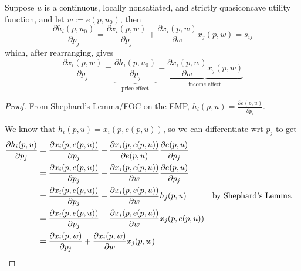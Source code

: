 \begin{prop}
  Suppose $u$ is a continuous, locally nonsatiated, and strictly
  quasiconcave utility function, and let $w := e(p, u_0)$, then
  \[
  \frac{\partial h_i (p, u_0)}{\partial p_j}
  = \frac{\partial x_i(p,w)}{\partial p_j}
  + \frac{\partial x_i(p,w)}{\partial w} x_j(p,w) 
  = s_{ij}
  \]
  which, after rearranging, gives
  \[
  \frac{\partial x_i(p,w)}{\partial p_j} 
  = \underbrace{\frac{\partial h_i (p, u_0)}{\partial p_j}}_{\text{price effect}}
  - \underbrace{\frac{\partial x_i(p,w)}{\partial w} x_j(p,w)}_{\text{income effect}}
  \]
\end{prop}

\begin{proof}
  From Shephard's Lemma/FOC on the EMP, $h_i(p,u) = \frac{\partial
    e(p,u)}{\partial p_i}$. 


  We know that $h_i(p,u) = x_i(p, e(p,u))$, so we can differentiate
  wrt $p_j$ to get
  \begin{align}
    \frac{\partial h_i(p,u)}{\partial p_j}
    & = \frac{\partial x_i(p, e(p,u))}{\partial p_j}
    + \frac{\partial x_i(p,e(p,u))}{\partial e(p,u)}
    \frac{\partial e(p,u)}{\partial p_j} & \notag \\
    & = \frac{\partial x_i(p, e(p,u))}{\partial p_j}
    + \frac{\partial x_i(p,e(p,u))}{\partial w}
    \frac{\partial e(p,u)}{\partial p_j} & \notag \\
    & = \frac{\partial x_i(p, e(p,u))}{\partial p_j}
    + \frac{\partial x_i(p,e(p,u))}{\partial w}
    h_j(p,u) & \text{by Shephard's Lemma} & \notag \\
    & = \frac{\partial x_i(p, e(p,u))}{\partial p_j}
    + \frac{\partial x_i(p,e(p,u))}{\partial w}
    x_j(p,e(p,u)) & \notag \\
    & = \frac{\partial x_i(p, w)}{\partial p_j}
    + \frac{\partial x_i(p,w)}{\partial w}
    x_j(p,w) & \notag
  \end{align}
\end{proof}

